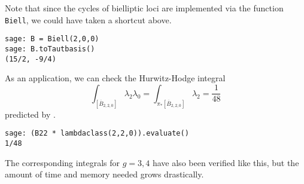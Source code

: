 \documentclass[11pt]{article}
\begin{document}
Note that since the cycles of bielliptic loci are implemented via the function \verb|Biell|, we could have taken a shortcut above.
\begin{lstlisting}
sage: B = Biell(2,0,0)
sage: B.toTautbasis()
(15/2, -9/4)
\end{lstlisting}
% 
% 

As an application, we can check the Hurwitz-Hodge integral
\[\int_{[\overline B_{2,2,0}]} \lambda_2 \lambda_0 = \int_{\pi_* [\overline B_{2,2,0}]} \lambda_2 = \frac{1}{48} \]
predicted by \cite{hurwitzhodge}.
\begin{lstlisting}
sage: (B22 * lambdaclass(2,2,0)).evaluate()
1/48
\end{lstlisting}
The corresponding integrals for $g=3,4$ have also been verified like this, but the amount of time and memory needed grows drastically.
\end{document}
